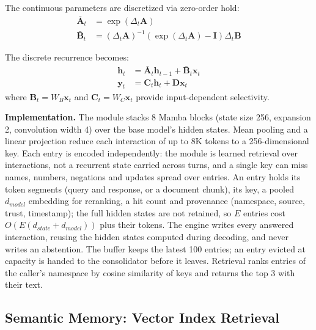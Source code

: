 \documentclass{article}
\begin{document}
The continuous parameters are discretized via zero-order hold:
\begin{align}
\bar{\mathbf{A}}_t &= \exp(\Delta_t \mathbf{A}) \\
\bar{\mathbf{B}}_t &= (\Delta_t \mathbf{A})^{-1}(\exp(\Delta_t \mathbf{A}) - \mathbf{I}) \Delta_t \mathbf{B} \label{eq:discretization}
\end{align}

The discrete recurrence becomes:
\begin{align}
\mathbf{h}_t &= \bar{\mathbf{A}}_t \mathbf{h}_{t-1} + \bar{\mathbf{B}}_t \mathbf{x}_t \\
\mathbf{y}_t &= \mathbf{C}_t \mathbf{h}_t + \mathbf{D} \mathbf{x}_t
\end{align}
where $\mathbf{B}_t = W_B \mathbf{x}_t$ and $\mathbf{C}_t = W_C \mathbf{x}_t$ provide input-dependent selectivity.

\textbf{Implementation.} The module stacks 8 Mamba blocks (state size 256, expansion 2, convolution width 4) over the base model's hidden states. Mean pooling and a linear projection reduce each interaction of up to 8K tokens to a 256-dimensional key. Each entry is encoded independently: the module is learned retrieval over interactions, not a recurrent state carried across turns, and a single key can miss names, numbers, negations and updates spread over entries. An entry holds its token segments (query and response, or a document chunk), its key, a pooled $d_{model}$ embedding for reranking, a hit count and provenance (namespace, source, trust, timestamp); the full hidden states are not retained, so $E$ entries cost $O(E(d_{state} + d_{model}))$ plus their tokens. The engine writes every answered interaction, reusing the hidden states computed during decoding, and never writes an abstention. The buffer keeps the latest 100 entries; an entry evicted at capacity is handed to the consolidator before it leaves. Retrieval ranks entries of the caller's namespace by cosine similarity of keys and returns the top 3 with their text.

\subsection{Semantic Memory: Vector Index Retrieval}
\end{document}
